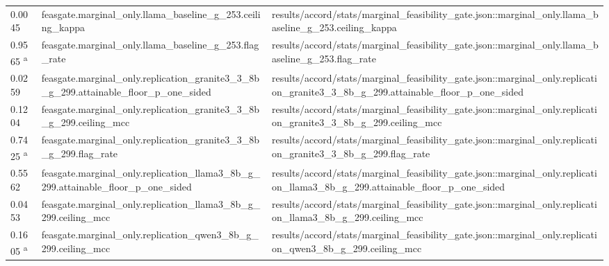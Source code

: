 \begin{longtable}{@{}p{0.7in}p{1.9in}p{2.6in}@{}}
0.0045 & feasgate.\allowbreak{}marginal\_only.\allowbreak{}llama\_baseline\_g\_253.\allowbreak{}ceiling\_kappa & results/\allowbreak{}accord/\allowbreak{}stats/\allowbreak{}marginal\_feasibility\_gate.\allowbreak{}json::marginal\_only.\allowbreak{}llama\_baseline\_g\_253.\allowbreak{}ceiling\_kappa\\
0.9565 \textsuperscript{a} & feasgate.\allowbreak{}marginal\_only.\allowbreak{}llama\_baseline\_g\_253.\allowbreak{}flag\_rate & results/\allowbreak{}accord/\allowbreak{}stats/\allowbreak{}marginal\_feasibility\_gate.\allowbreak{}json::marginal\_only.\allowbreak{}llama\_baseline\_g\_253.\allowbreak{}flag\_rate\\
0.0259 & feasgate.\allowbreak{}marginal\_only.\allowbreak{}replication\_granite3\_3\_8b\_g\_299.\allowbreak{}attainable\_floor\_p\_one\_sided & results/\allowbreak{}accord/\allowbreak{}stats/\allowbreak{}marginal\_feasibility\_gate.\allowbreak{}json::marginal\_only.\allowbreak{}replication\_granite3\_3\_8b\_g\_299.\allowbreak{}attainable\_floor\_p\_one\_sided\\
0.1204 & feasgate.\allowbreak{}marginal\_only.\allowbreak{}replication\_granite3\_3\_8b\_g\_299.\allowbreak{}ceiling\_mcc & results/\allowbreak{}accord/\allowbreak{}stats/\allowbreak{}marginal\_feasibility\_gate.\allowbreak{}json::marginal\_only.\allowbreak{}replication\_granite3\_3\_8b\_g\_299.\allowbreak{}ceiling\_mcc\\
0.7425 \textsuperscript{a} & feasgate.\allowbreak{}marginal\_only.\allowbreak{}replication\_granite3\_3\_8b\_g\_299.\allowbreak{}flag\_rate & results/\allowbreak{}accord/\allowbreak{}stats/\allowbreak{}marginal\_feasibility\_gate.\allowbreak{}json::marginal\_only.\allowbreak{}replication\_granite3\_3\_8b\_g\_299.\allowbreak{}flag\_rate\\
0.5562 & feasgate.\allowbreak{}marginal\_only.\allowbreak{}replication\_llama3\_8b\_g\_299.\allowbreak{}attainable\_floor\_p\_one\_sided & results/\allowbreak{}accord/\allowbreak{}stats/\allowbreak{}marginal\_feasibility\_gate.\allowbreak{}json::marginal\_only.\allowbreak{}replication\_llama3\_8b\_g\_299.\allowbreak{}attainable\_floor\_p\_one\_sided\\
0.0453 & feasgate.\allowbreak{}marginal\_only.\allowbreak{}replication\_llama3\_8b\_g\_299.\allowbreak{}ceiling\_mcc & results/\allowbreak{}accord/\allowbreak{}stats/\allowbreak{}marginal\_feasibility\_gate.\allowbreak{}json::marginal\_only.\allowbreak{}replication\_llama3\_8b\_g\_299.\allowbreak{}ceiling\_mcc\\
0.1605 \textsuperscript{a} & feasgate.\allowbreak{}marginal\_only.\allowbreak{}replication\_qwen3\_8b\_g\_299.\allowbreak{}ceiling\_mcc & results/\allowbreak{}accord/\allowbreak{}stats/\allowbreak{}marginal\_feasibility\_gate.\allowbreak{}json::marginal\_only.\allowbreak{}replication\_qwen3\_8b\_g\_299.\allowbreak{}ceiling\_mcc\\

\end{longtable}
